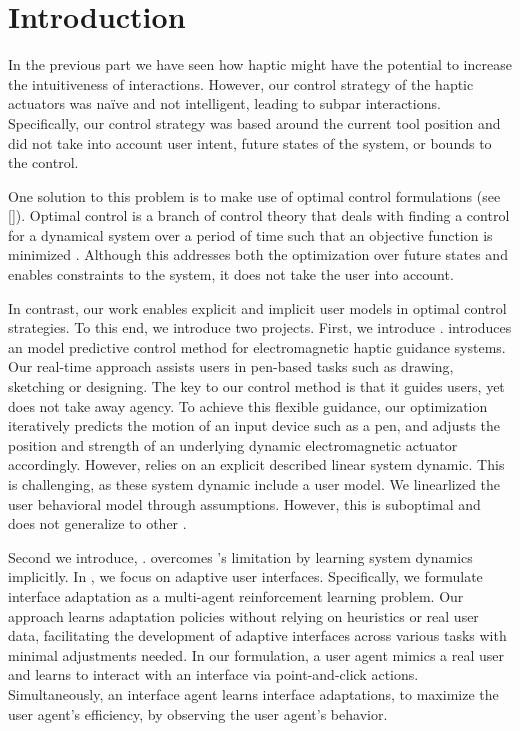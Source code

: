 \chapter{Introduction}
\label{ch:control:introduction}
In the previous part we have seen how haptic \interfaces might have the potential to increase the intuitiveness of interactions. However, our control strategy of the haptic actuators was na\"ive and not intelligent, leading to subpar interactions. Specifically, our control strategy was based around the current tool position and did not take into account user intent, future states of the system, or bounds to the control.  

One solution to this problem is to make use of optimal control formulations (see \ref{}). Optimal control is a branch of control theory that deals with finding a control for a dynamical system over a period of time such that an objective function is minimized \cite{ross2015primer}. Although this addresses both the optimization over future states and enables constraints to the system, it does not take the user into account. 

In contrast, our work enables explicit and implicit user models in optimal control strategies. To this end, we introduce two projects. First, we introduce \magpen. \magpen introduces an model predictive control method for electromagnetic haptic guidance systems. Our real-time approach assists users in pen-based tasks such as
drawing, sketching or designing. The key to our control method is that it guides users, yet does not take away agency. To achieve this flexible guidance, our optimization iteratively predicts the motion of an input device such as a pen, and adjusts the position and strength of an underlying dynamic electromagnetic actuator accordingly. However, \magpen relies on an explicit described linear system dynamic. This is challenging, as these system dynamic include a user model. We linearlized the user behavioral model through assumptions. However, this is suboptimal and does not generalize to other \interfaces. 

Second we introduce, \marlui. \marlui overcomes \magpen's limitation by learning system dynamics implicitly. In \marlui, we focus on adaptive user interfaces. Specifically, we formulate interface adaptation as a multi-agent reinforcement learning problem. Our approach learns adaptation policies without relying on heuristics or real user data, facilitating the development of adaptive interfaces across various tasks with minimal adjustments needed. In our formulation, a user agent mimics a real user and learns to interact with an interface via point-and-click actions. Simultaneously, an interface agent learns interface adaptations, to maximize the user agent’s efficiency, by observing the user agent’s behavior. 

